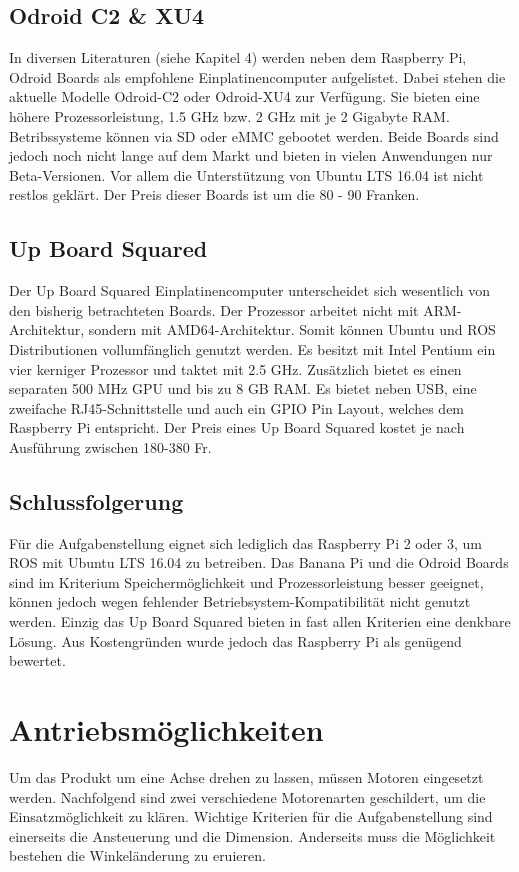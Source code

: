  
\subsection{Odroid C2 \& XU4} 
\label{subsec:Odroid}
In diversen Literaturen (siehe \cite{ROSprojects} Kapitel 4) werden neben dem Raspberry Pi, Odroid Boards als empfohlene Einplatinencomputer aufgelistet. Dabei stehen die aktuelle Modelle Odroid-C2 oder Odroid-XU4 zur Verfügung. Sie bieten eine höhere Prozessorleistung, 1.5 GHz bzw. 2 GHz mit je 2 Gigabyte \ac{RAM}. Betribssysteme können via \ac{SD} oder \ac{eMMC} gebootet werden. Beide Boards sind jedoch noch nicht lange auf dem Markt und bieten in vielen Anwendungen nur Beta-Versionen. Vor allem die Unterstützung von Ubuntu LTS 16.04 ist nicht restlos geklärt. Der Preis dieser Boards ist um die 80 - 90 Franken.

\subsection{Up Board Squared} 
\label{subsec:Lattepanda}
Der Up Board Squared Einplatinencomputer unterscheidet sich wesentlich von den bisherig betrachteten Boards. Der Prozessor arbeitet nicht mit ARM-Architektur, sondern mit AMD64-Architektur. Somit können Ubuntu und ROS Distributionen vollumfänglich genutzt werden. Es besitzt mit Intel Pentium ein vier kerniger Prozessor und taktet mit 2.5 GHz. Zusätzlich bietet es einen separaten 500 MHz \ac{GPU} und bis zu 8 GB \ac{RAM}. Es bietet neben USB, eine zweifache RJ45-Schnittstelle und auch ein GPIO Pin Layout, welches dem Raspberry Pi entspricht. Der Preis eines Up Board Squared kostet je nach Ausführung zwischen 180-380 Fr.

\subsection{Schlussfolgerung}
\label{subsec:Schlussfolgerung}
Für die Aufgabenstellung eignet sich lediglich das Raspberry Pi 2 oder 3, um ROS mit Ubuntu LTS 16.04 zu betreiben. Das Banana Pi und die Odroid Boards sind im Kriterium Speichermöglichkeit und Prozessorleistung besser geeignet, können jedoch wegen fehlender Betriebsystem-Kompatibilität nicht genutzt werden. Einzig das Up Board Squared bieten in fast allen Kriterien eine denkbare Lösung. Aus Kostengründen wurde jedoch das Raspberry Pi als genügend bewertet.  

\section{Antriebsmöglichkeiten}
\label{sec:Antriebsmoeglichkeiten}
Um das Produkt um eine Achse drehen zu lassen, müssen Motoren eingesetzt werden. Nachfolgend sind zwei verschiedene Motorenarten geschildert, um die Einsatzmöglichkeit zu klären. Wichtige Kriterien für die Aufgabenstellung sind einerseits die Ansteuerung und die Dimension. Anderseits muss die Möglichkeit bestehen die Winkeländerung zu eruieren. 

